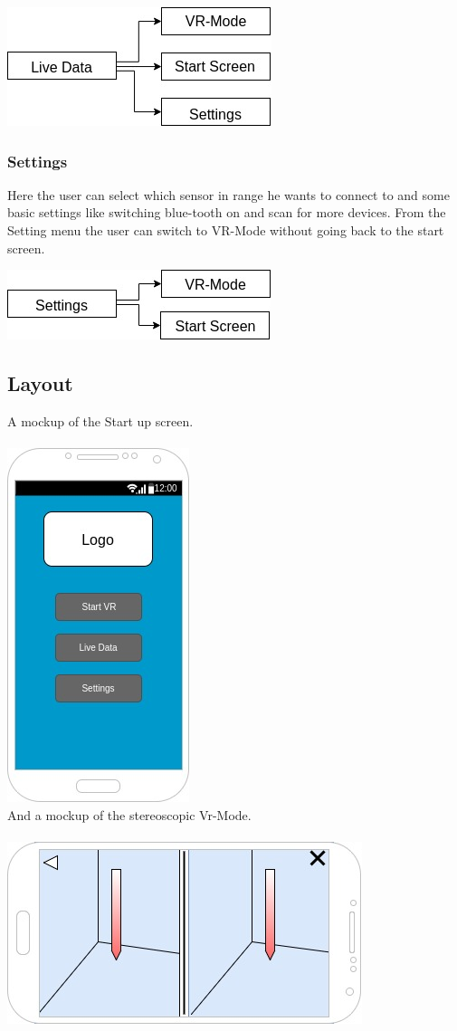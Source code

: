 \includegraphics[scale=0.5]{pics/Live_Data.jpg}

\newpage

\subsubsection{Settings}

Here the user can select which sensor in range he wants to connect to and some basic settings like switching blue-tooth on and scan for more devices.
From the Setting menu the user can switch to VR-Mode without going back to the start screen.

\includegraphics[scale=0.5]{pics/Settings.jpg}

\subsection{Layout}

A mockup of the Start up screen. 
\\
\\
\includegraphics[scale=0.5]{pics/startScreen_mockup.jpg}
\\

And a mockup of the stereoscopic Vr-Mode.
\\
\\
\includegraphics[scale=0.5]{pics/VRView_mockup.jpg}
